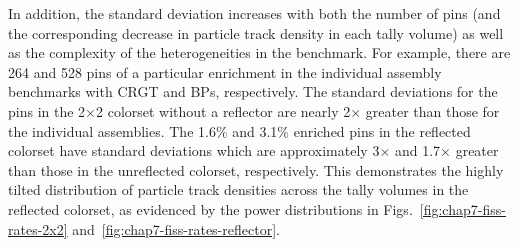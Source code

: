In addition, the standard deviation increases with both the number of pins (and the corresponding decrease in particle track density in each tally volume) as well as the complexity of the heterogeneities in the benchmark. For example, there are 264 and 528 pins of a particular enrichment in the individual assembly benchmarks with \ac{CRGT} and \acp{BP}, respectively. The standard deviations for the pins in the 2$\times$2 colorset without a reflector are nearly 2$\times$ greater than those for the individual assemblies. The 1.6\% and 3.1\% enriched pins in the reflected colorset have standard deviations which are approximately 3$\times$ and 1.7$\times$ greater than those in the unreflected colorset, respectively. This demonstrates the highly tilted distribution of particle track densities across the tally volumes in the reflected colorset, as evidenced by the power distributions in Figs.~\ref{fig:chap7-fiss-rates-2x2} and~\ref{fig:chap7-fiss-rates-reflector}.

